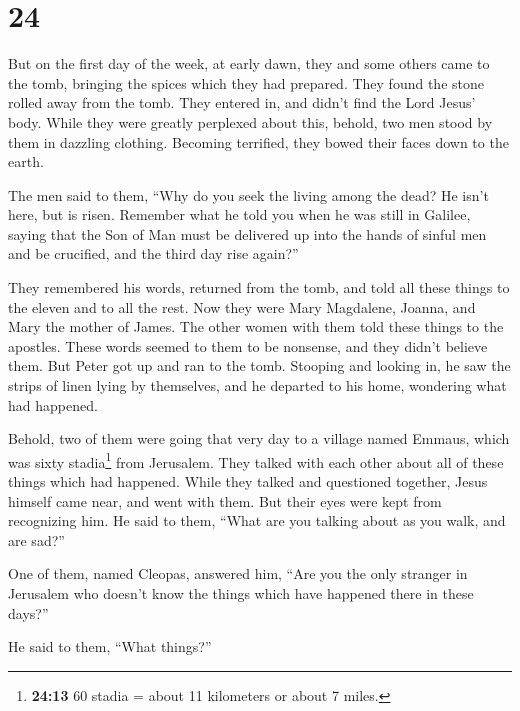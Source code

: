 \hypertarget{section-14}{%
\section{24}\label{section-14}}

 But on the first day of the week, at early dawn, they and
some others came to the tomb, bringing the spices which they had
prepared.  They found the stone rolled away from the tomb.
 They entered in, and didn't find the Lord Jesus' body.
 While they were greatly perplexed about this, behold, two
men stood by them in dazzling clothing.  Becoming
terrified, they bowed their faces down to the earth.

The men said to them, ``Why do you seek the living among the dead?
 He isn't here, but is risen. Remember what he told you
when he was still in Galilee,  saying that the Son of Man
must be delivered up into the hands of sinful men and be crucified, and
the third day rise again?''

 They remembered his words,  returned from
the tomb, and told all these things to the eleven and to all the rest.
 Now they were Mary Magdalene, Joanna, and Mary the
mother of James. The other women with them told these things to the
apostles.  These words seemed to them to be nonsense, and
they didn't believe them.  But Peter got up and ran to
the tomb. Stooping and looking in, he saw the strips of linen lying by
themselves, and he departed to his home, wondering what had happened.

 Behold, two of them were going that very day to a
village named Emmaus, which was sixty stadia\footnote{\textbf{24:13} 60
  stadia = about 11 kilometers or about 7 miles.} from Jerusalem.
 They talked with each other about all of these things
which had happened.  While they talked and questioned
together, Jesus himself came near, and went with them. 
But their eyes were kept from recognizing him.  He said
to them, ``What are you talking about as you walk, and are sad?''

 One of them, named Cleopas, answered him, ``Are you the
only stranger in Jerusalem who doesn't know the things which have
happened there in these days?''

 He said to them, ``What things?''

